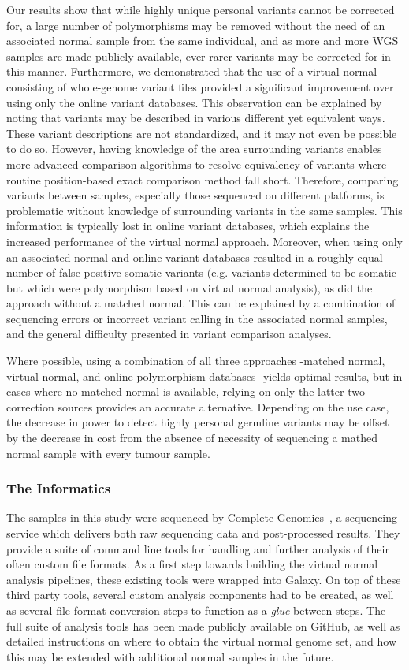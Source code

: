 Our results show that while highly unique personal variants cannot be corrected for, a large number of polymorphisms may be removed without the need of an associated normal sample from the same individual, and as more and more WGS samples are made publicly available, ever rarer variants may be corrected for in this manner. Furthermore, we demonstrated that the use of a virtual normal consisting of whole-genome variant files provided a significant improvement over using only the online variant databases. This observation can be explained by noting that variants may be described in various different yet equivalent ways. These variant descriptions are not standardized, and it may not even be possible to do so. However, having knowledge of the area surrounding variants enables more advanced comparison algorithms to resolve equivalency of variants where routine position-based exact comparison method fall short. Therefore, comparing variants between samples, especially those sequenced on different platforms, is problematic without knowledge of surrounding variants in the same samples. This information is typically lost in online variant databases, which explains the increased performance of the virtual normal approach. Moreover, when using only an associated normal and online variant databases resulted in a roughly equal number of false-positive somatic variants (e.g. variants determined to be somatic but which were polymorphism based on virtual normal analysis), as did the approach without a matched normal. This can be explained by a combination of sequencing errors or incorrect variant calling in the associated normal samples, and the general difficulty presented in variant comparison analyses.

Where possible, using a combination of all three approaches -matched normal, virtual normal, and online polymorphism databases- yields optimal results, but in cases where no matched normal is available, relying on only the latter two correction sources provides an accurate alternative. Depending on the use case, the decrease in power to detect highly personal germline variants may be offset by the decrease in cost from the absence of necessity of sequencing a mathed normal sample with every tumour sample.

\subsubsection{The Informatics}
The samples in this study were sequenced by Complete Genomics~\cite{drmanac}, a sequencing service which delivers both raw sequencing data and post-processed results. They provide a suite of command line tools for handling and further analysis of their often custom file formats. As a first step towards building the virtual normal analysis pipelines, these existing tools were wrapped into Galaxy. On top of these third party tools, several custom analysis components had to be created, as well as several file format conversion steps to function as a \emph{glue} between steps. The full suite of analysis tools has been made publicly available on GitHub, as well as detailed instructions on where to obtain the virtual normal genome set, and how this may be extended with additional normal samples in the future.


